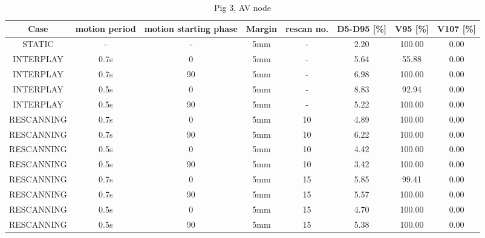 \documentclass[type=dr, dr=rernat, accentcolor=tud7b,colorbacktitle, bigchapter, openright, twoside, 12pt ]{tudthesis}
\begin{document}
\begin{table}[H]
  \centering
  \tiny
  \caption{Pig 3, AV node}
  \begin{tabular}{|c||c|c|c|c||c|c|c|}
    \hline\hline
    Case & motion period & motion starting phase & Margin & rescan no. & D5-D95 [\%] & V95 [\%] & V107 [\%] \\
    \hline 
STATIC & - & - & 5mm & - & 2.20 & 100.00 & 0.00\\
INTERPLAY & 0.7s & 0 & 5mm & - & 5.64 & 55.88 & 0.00\\
INTERPLAY & 0.7s & 90 & 5mm & - & 6.98 & 100.00 & 0.00\\
INTERPLAY & 0.5s & 0 & 5mm & - & 8.83 & 92.94 & 0.00\\
INTERPLAY & 0.5s & 90 & 5mm & - & 5.22 & 100.00 & 0.00\\
RESCANNING & 0.7s & 0 & 5mm & 10 & 4.89 & 100.00 & 0.00\\
RESCANNING & 0.7s & 90 & 5mm & 10 & 6.22 & 100.00 & 0.00\\
RESCANNING & 0.5s & 0 & 5mm & 10 & 4.42 & 100.00 & 0.00\\
RESCANNING & 0.5s & 90 & 5mm & 10 & 3.42 & 100.00 & 0.00\\
RESCANNING & 0.7s & 0 & 5mm & 15 & 5.85 & 99.41 & 0.00\\
RESCANNING & 0.7s & 90 & 5mm & 15 & 5.57 & 100.00 & 0.00\\
RESCANNING & 0.5s & 0 & 5mm & 15 & 4.70 & 100.00 & 0.00\\
RESCANNING & 0.5s & 90 & 5mm & 15 & 5.38 & 100.00 & 0.00\\
    \hline\hline 
  \end{tabular}
  \label{tab:Pig3_AV}
\end{table}

\vspace*{-0.4cm}
\end{document}
